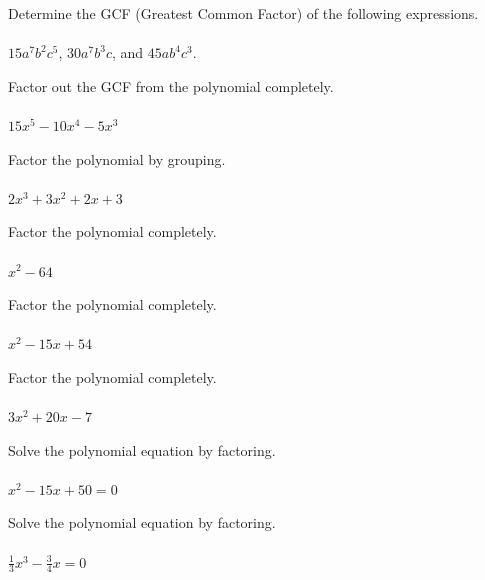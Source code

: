 \documentclass[addpoints,12pt,answers]{exam}
\begin{document}
\vspace{-.5cm}


\begin{questions}

\question[5] Determine the GCF (Greatest Common Factor) of the following expressions.\\ \\ $15a^7b^2c^5$, $30a^7b^3c$, and $45ab^4c^3$.
\answerline

\question[5] Factor out the GCF from the polynomial completely.\\ \\ $15x^5-10x^4-5x^3$
\answerline

\newpage

\question[5] Factor the polynomial by grouping.\\ \\ $2x^3+3x^2+2x+3$
\answerline

\question[5] Factor the polynomial completely.\\ \\ $x^2-64$
\answerline

\newpage

\question[5] Factor the polynomial completely.\\ \\ $x^2-15x+54$
\answerline

\question[5] Factor the polynomial completely.\\ \\ $3x^2+20x-7$
\answerline

\newpage

\question[5] Solve the polynomial equation by factoring.\\ \\ $x^2-15x+50=0$
 \answerline

\question[5] Solve the polynomial equation by factoring.\\ \\ $\frac{1}{3}x^3-\frac{3}{4}x=0$
 \answerline


\end{questions}
\end{document}
